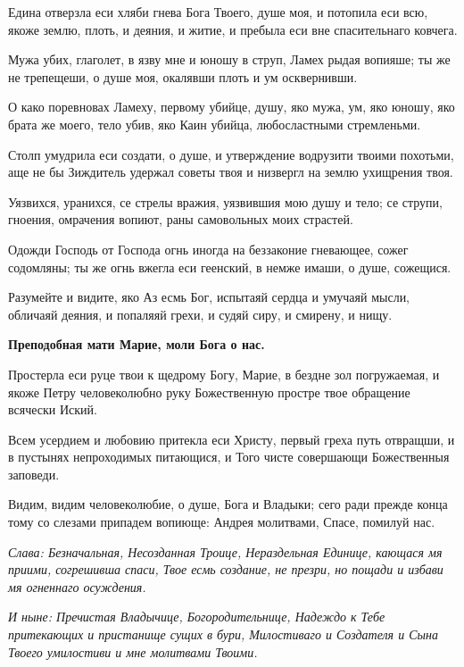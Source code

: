 Едина отверзла еси хляби гнева Бога Твоего, душе моя, и потопила еси всю, якоже землю, плоть, и деяния, и житие, и пребыла еси вне спасительнаго ковчега.

Мужа убих, глаголет, в язву мне и юношу в струп, Ламех рыдая вопияше; ты же не трепещеши, о душе моя, окалявши плоть и ум осквернивши.

О како поревновах Ламеху, первому убийце, душу, яко мужа, ум, яко юношу, яко брата же моего, тело убив, яко Каин убийца, любосластными стремленьми.

Столп умудрила еси создати, о душе, и утверждение водрузити твоими похотьми, аще не бы Зиждитель удержал советы твоя и низвергл на землю ухищрения твоя.

Уязвихся, уранихся, се стрелы вражия, уязвившия мою душу и тело; се струпи, гноения, омрачения вопиют, раны самовольных моих страстей.

Одожди Господь от Господа огнь иногда на беззаконие гневающее, сожег содомляны; ты же огнь вжегла еси геенский, в немже имаши, о душе, сожещися.

Разумейте и видите, яко Аз есмь Бог, испытаяй сердца и умучаяй мысли, обличаяй деяния, и попаляяй грехи, и судяй сиру, и смирену, и нищу.

\bfseries Преподобная мати Марие, моли Бога о нас.

\normalfont{}Простерла еси руце твои к щедрому Богу, Марие, в бездне зол погружаемая, и якоже Петру человеколюбно руку Божественную простре твое обращение всячески Иский.


Всем усердием и любовию притекла еси Христу, первый греха путь отвращши, и в пустынях непроходимых питающися, и Того чисте совершающи Божественныя заповеди.


Видим, видим человеколюбие, о душе, Бога и Владыки; сего ради прежде конца тому со слезами припадем вопиюще: Андрея молитвами, Спасе, помилуй нас.

\itshape Слава\normalfont{}: Безначальная, Несозданная Троице, Нераздельная Единице, кающася мя приими, согрешивша спаси, Твое есмь создание, не презри, но пощади и избави мя огненнаго осуждения.

\itshape И ныне\normalfont{}: Пречистая Владычице, Богородительнице, Надеждо к Тебе притекающих и пристанище сущих в бури, Милостиваго и Создателя и Сына Твоего умилостиви и мне молитвами Твоими. 

